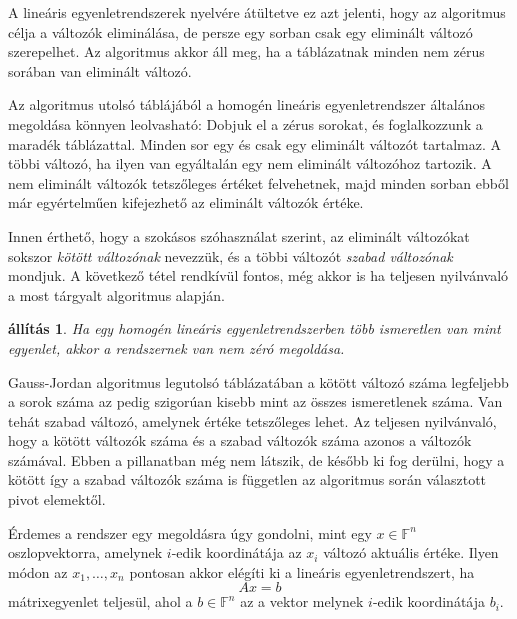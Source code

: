 \documentclass[9pt, a4paper, showtrims]{memoir}
\makeatletter
\renewenvironment{proof}[1][\proofname]
    {\par\pushQED{\qed}%
    \normalfont \topsep6\p@\@plus6\p@\relax
    \trivlist
    \item[\hskip\labelsep
        \itshape
    #1\@addpunct{:}]\ignorespaces}
    {\popQED\endtrivlist\@endpefalse}
\theoremstyle{plain}
\newtheorem{proposition}{állítás}[chapter]
\theoremstyle{remark}
\theoremstyle{definition}
\makeatother
\begin{document}
A lineáris egyenletrendszerek nyelvére átültetve ez azt jelenti, 
hogy az algoritmus célja a változók eliminálása,
de persze egy sorban csak egy eliminált változó szerepelhet.
Az algoritmus akkor áll meg, 
ha a táblázatnak minden nem zérus sorában van eliminált változó.

Az algoritmus utolsó táblájából a homogén lineáris egyenletrendszer általános megoldása könnyen leolvasható:
Dobjuk el a zérus sorokat, és foglalkozzunk a maradék táblázattal.
Minden sor egy és csak egy eliminált változót tartalmaz.
A többi változó, ha ilyen van egyáltalán egy nem eliminált változóhoz tartozik.
A nem eliminált változók tetszőleges értéket felvehetnek, 
majd minden sorban ebből már egyértelműen kifejezhető az eliminált változók értéke.

Innen érthető, 
hogy a szokásos szóhasználat szerint, az eliminált változókat sokszor
\emph{kötött változónak}
nevezzük,
és a többi változót 
\emph{szabad változónak}
mondjuk.
A következő tétel rendkívül fontos, még akkor is ha teljesen nyilvánvaló a most tárgyalt algoritmus alapján.
\begin{proposition}
    Ha egy homogén lineáris egyenletrendszerben több ismeretlen van mint egyenlet,
    akkor a rendszernek van nem zéró megoldása.
\end{proposition}
\begin{proof}
    Gauss-Jordan algoritmus  legutolsó táblázatában
    a kötött változó száma legfeljebb a sorok száma az pedig szigorúan kisebb mint az összes ismeretlenek száma.
    Van tehát szabad változó, amelynek értéke tetszőleges lehet.
\end{proof}
Az teljesen nyilvánvaló, hogy a kötött változók száma és a szabad változók száma azonos a változók számával.
Ebben a pillanatban még nem látszik,
de később ki fog derülni, 
hogy a kötött így a szabad változók száma is független az algoritmus során választott pivot elemektől.

Érdemes a rendszer egy megoldásra úgy gondolni, mint egy $x\in\mathbb{F}^n$ oszlopvektorra,
amelynek $i$-edik koordinátája az $x_i$ változó aktuális értéke.
Ilyen módon az $x_1,\dots,x_n$ pontosan akkor elégíti ki a lineáris egyenletrendszert,
ha
\[
    Ax=b
\]
mátrixegyenlet teljesül, ahol a $b\in\mathbb{F}^n$ az a vektor melynek $i$-edik koordinátája $b_i$.
\end{document}
